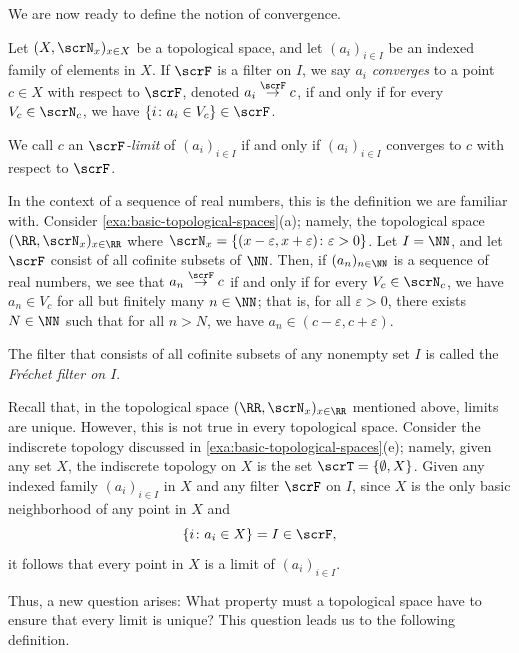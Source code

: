 We are now ready to define the notion of convergence.

\begin{definition}
  Let $(X, \scrN_x)_{x\in X}$ be a topological space, and let $(a_i)_{i\in I}$ be an indexed family of elements in $X$.
  If $\scrF$ is a filter on $I$, we say $a_i$ \emph{converges} to a point $c\in X$ with respect to $\scrF$, denoted $a_i\overset{\scrF}\to c$, if and only if for every $V_c\in\scrN_c$, we have $\{i \colon a_i\in V_c\}\in\scrF$.

  We call $c$ an \emph{$\scrF$-limit} of $(a_i)_{i\in I}$ if and only if $(a_i)_{i\in I}$ converges to $c$ with respect to $\scrF$.

\end{definition}

In the context of a sequence of real numbers, this is the definition we are familiar with.
Consider \cref{exa:basic-topological-spaces}(a);
namely, the topological space $(\RR,\scrN_x)_{x\in \RR}$ where $\scrN_x = \{(x-\varepsilon,x+\varepsilon) \colon \varepsilon>0\}$.
Let $I=\NN$, and let $\scrF$ consist of all cofinite subsets of $\NN$.
Then, if $(a_n)_{n\in \NN}$ is a sequence of real numbers, we see that $a_n \overset{\scrF}\to c$ if and only if for every $V_c\in\scrN_c$, we have $a_n\in V_c$ for all but finitely many $n\in\NN$;
that is, for all $\varepsilon >0$, there exists  $N\in\NN$ such that for all $n>N$, we have $a_n\in(c-\varepsilon,c+\varepsilon)$.

\begin{definition}
  The filter that consists of all cofinite subsets of any nonempty set $I$ is called the \emph{Fréchet filter on $I$}.
\end{definition}

Recall that, in the topological space $(\RR,\scrN_x)_{x\in \RR}$ mentioned above, limits are unique.
However, this is not true in every topological space.
Consider the indiscrete topology discussed in \cref{exa:basic-topological-spaces}(e);
namely, given any set $X$, the indiscrete topology on $X$ is the set $\scrT=\{\emptyset, X\}$.
Given any indexed family $(a_i)_{i\in I}$ in $X$ and any filter $\scrF$ on $I$, since $X$ is the only basic neighborhood of any point in $X$ and \[\{i\colon a_i\in X\}=I\in\scrF\text{,}\] it follows that every point in $X$ is a limit of $(a_i)_{i\in I}$.

Thus, a new question arises:
What property must a topological space have to ensure that every limit is unique?
This question leads us to the following definition.

